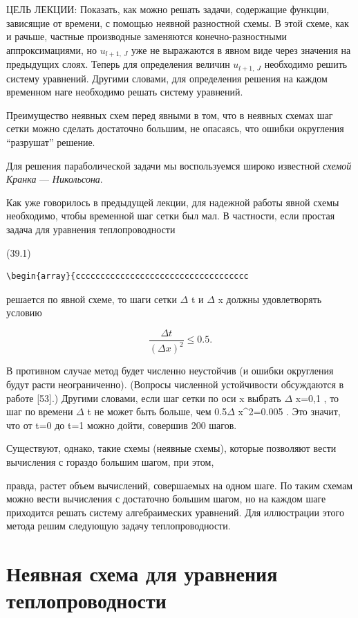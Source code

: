 \documentclass[
  ukrainian,
]{article}
\begin{document}
ЦЕЛЬ ЛЕКЦИИ: Показать, как можно решать задачи, содержащие функции,
зависящие от времени, с помощью неявной разностной схемы. В этой схеме,
как и рачьше, частные производные заменяются конечно-разностными
аппроксимациями, но \(u_{l+1,\ J}\) уже не выражаются в явном виде через
значения на предыдущих слоях. Теперь для определения величин
\(u_{l+1,\ J}\) необходимо решить систему уравнений. Другими словами,
для определения решения на каждом временном наге необходимо решать
систему уравнений.

Преимущество неявных схем перед явными в том, что в неявных схемах шаг
сетки можно сделать достаточно большим, не опасаясь, что ошибки
округления ``разрушат'' решение.

Для решения параболической задачи мы воспользуемся широко известной
\emph{схемой Кранка} --- \emph{Никольсона}.

Как уже говорилось в предыдущей лекции, для надежной работы явной схемы
необходимо, чтобы временной шаг сетки был мал. В частности, если простая
задача для уравнения теплопроводности

(39.1)

\begin{verbatim}
\begin{array}{ccccccccccccccccccccccccccccccccccc
\end{verbatim}

решается по явной схеме, то шаги сетки \(\Delta\) t и \(\Delta\) x
должны удовлетворять условию

\[
\frac{\Delta t}{(\Delta x)^2} \leqslant 0.5.
\]

В противном случае метод будет численно неустойчив (и ошибки округления
будут расти неограниченно). (Вопросы численной устойчивости обсуждаются
в работе {[}53{]}.) Другими словами, если шаг сетки по оси x выбрать
\(\Delta\) x=0,1 , то шаг по времени \(\Delta\) t не может быть больше,
чем 0.5\(\Delta\) x\^{}2=0.005 . Это значит, что от t=0 до t=1 можно
дойти, совершив 200 шагов.

Существуют, однако, такие схемы (неявные схемы), которые позволяют вести
вычисления с гораздо большим шагом, при этом,

правда, растет объем вычислений, совершаемых на одном шаге. По таким
схемам можно вести вычисления с достаточно большим шагом, но на каждом
шаге приходится решать систему алгебраимеских уравнений. Для иллюстрации
этого метода решим следующую задачу теплопроводности.

\section{Неявная схема для уравнения
теплопроводности}\label{ux43dux435ux44fux432ux43dux430ux44f-ux441ux445ux435ux43cux430-ux434ux43bux44f-ux443ux440ux430ux432ux43dux435ux43dux438ux44f-ux442ux435ux43fux43bux43eux43fux440ux43eux432ux43eux434ux43dux43eux441ux442ux438}
\end{document}
